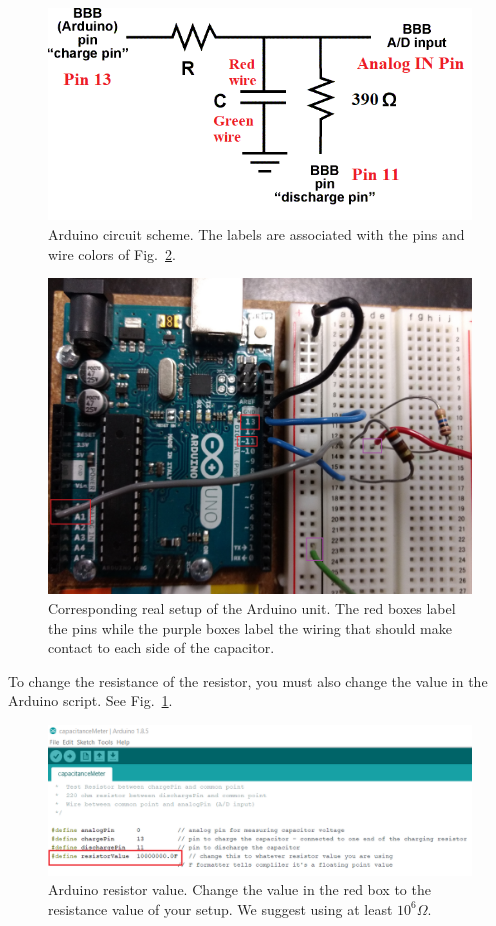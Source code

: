 \documentclass[12pt]{report}
\begin{document}
\begin{figure}[H]
\centering
\includegraphics[scale=0.85]{CapacitanceMeterSchem.png}
\caption{Arduino circuit scheme. The labels are associated with the pins and wire colors of Fig.~\ref{Fig:Arduino-real.png}.}
\label{Fig:ArduinoSchem}
\end{figure}

\begin{figure}[h]
\centering
\includegraphics[width=0.8 \textwidth]{lab1-Arduino-circuit-board.jpg}
\caption{Corresponding real setup of the Arduino unit. The red boxes label the pins while the purple boxes label the wiring that should make contact to each side of the capacitor.}
\label{Fig:Arduino-real.png}
\end{figure}

To change the resistance of the resistor, you must also change the value in the Arduino script. See Fig.~\ref{Fig:ArduinoSchem}.
\begin{figure}[H]
\centering
\includegraphics[width=0.9 \textwidth]{lab1-Arduino-resistance.png}
\caption{Arduino resistor value. Change the value in the red box to the resistance value of your setup. We suggest using at least $10^6 \Omega$.}
\label{Fig:ArduinoResistance}
\end{figure}
\end{document}
